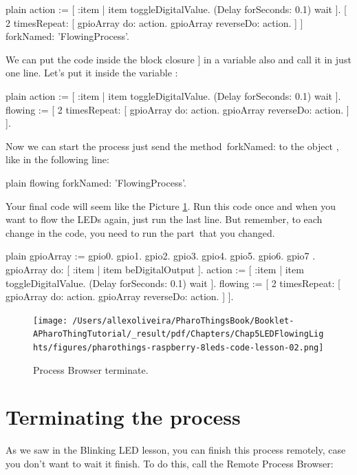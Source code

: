 \documentclass[10pt,twoside,english]{_support/latex/sbabook/sbabook}
\begin{document}
\begin{displaycode}{plain}
action := [ :item | item toggleDigitalValue. (Delay forSeconds: 0.1) wait ].
[ 2 timesRepeat: [
    gpioArray do: action.
    gpioArray reverseDo: action.
] ] forkNamed: 'FlowingProcess'.
\end{displaycode}

We can put the code inside the block closure \symbol{34}{[} {]} in a variable also and call it in just one line. Let's put it inside the variable :

\begin{displaycode}{plain}
action := [ :item | item toggleDigitalValue. (Delay forSeconds: 0.1) wait ].
flowing := [ 2 timesRepeat: [
    gpioArray do: action.
    gpioArray reverseDo: action.
] ].
\end{displaycode}

Now we can start the process just send the method forkNamed: to the object , like in the following line:

\begin{displaycode}{plain}
flowing forkNamed: 'FlowingProcess'.
\end{displaycode}

Your final code will seem like the Picture \ref{Process8LEDs}. Run this code once and when you want to flow the LEDs again, just run the last line. But remember, to each change in the code, you need to run the part that you changed. 

\begin{displaycode}{plain}
gpioArray := { gpio0. gpio1. gpio2. gpio3. gpio4. gpio5. gpio6. gpio7 }.
gpioArray do: [ :item | item beDigitalOutput ].
action := [ :item | item toggleDigitalValue. (Delay forSeconds: 0.1) wait ].
flowing := [ 2 timesRepeat: [
	gpioArray do: action.
	gpioArray reverseDo: action.
] ].
\end{displaycode}


\begin{figure}

\begin{center}
\texttt{[image: /Users/allexoliveira/PharoThingsBook/Booklet-APharoThingTutorial/\_result/pdf/Chapters/Chap5LEDFlowingLights/figures/pharothings-raspberry-8leds-code-lesson-02.png]}\caption{Process Browser terminate.\label{Process8LEDs}}\end{center}
\end{figure}

\section{Terminating the process}
As we saw in the Blinking LED lesson, you can finish this process remotely, case you don’t want to wait it finish. To do this, call the Remote Process Browser:
\end{document}
